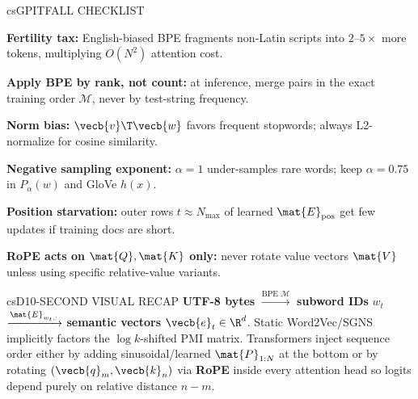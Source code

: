 \documentclass[../../../../master.tex]{subfiles}
\begin{document}
\begin{cscolumns}
\begin{cscard}{csG}{PITFALL CHECKLIST}
  \begin{csbul}
    \item \textbf{Fertility tax:} English-biased BPE fragments non-Latin scripts into $2\text{--}5\times$ more tokens, multiplying $O(N^2)$ attention cost.
    \item \textbf{Apply BPE by rank, not count:} at inference, merge pairs in the exact training order $\mathcal{M}$, never by test-string frequency.
    \item \textbf{Norm bias:} $\vecb{v}\T\vecb{w}$ favors frequent stopwords; always L2-normalize for cosine similarity.
    \item \textbf{Negative sampling exponent:} $\alpha=1$ under-samples rare words; keep $\alpha=0.75$ in $P_\alpha(w)$ and GloVe $h(x)$.
    \item \textbf{Position starvation:} outer rows $t\approx N_{\max}$ of learned $\mat{E}_{\mathrm{pos}}$ get few updates if training docs are short.
    \item \textbf{RoPE acts on $\mat{Q},\mat{K}$ only:} never rotate value vectors $\mat{V}$ unless using specific relative-value variants.
  \end{csbul}
\end{cscard}

\begin{cscard}{csD}{10-SECOND VISUAL RECAP}
  \sffamily\footnotesize
  \textbf{UTF-8 bytes} $\xrightarrow{\text{BPE }\mathcal{M}}$ \textbf{subword IDs} $w_t$ $\xrightarrow{\mat{E}_{w_t,:}}$ \textbf{semantic vectors} $\vecb{e}_t\in\R^d$.
  Static Word2Vec/SGNS implicitly factors the $\log k$-shifted PMI matrix.
  Transformers inject sequence order either by adding sinusoidal/learned $\mat{P}_{1:N}$ at the bottom or by rotating $(\vecb{q}_m,\vecb{k}_n)$ via \textbf{RoPE} inside every attention head so logits depend purely on relative distance $n-m$.
\end{cscard}
\end{cscolumns}

\csend
\end{document}

